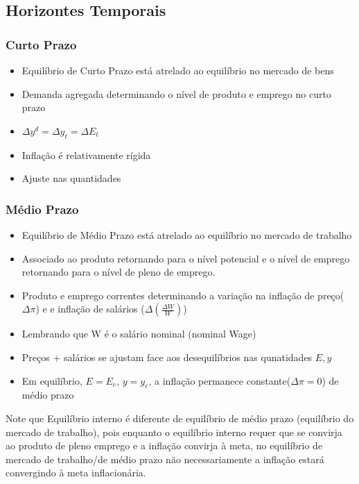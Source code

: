 \documentclass[a4paper,12pt]{article}[abntex2]
\begin{document}
\subsection{\textbf{Horizontes Temporais}}
\subsubsection{\textbf{Curto Prazo}}
\begin{itemize}
    \item Equilíbrio de Curto Prazo está atrelado ao equilíbrio no mercado de bens
    \item Demanda agregada determinando o nível de produto e emprego no curto prazo
    \item $\Delta y^d =\Delta y_t =\Delta E_t$
    \item Inflação é relativamente rígida
    \item Ajuste nas quantidades
\end{itemize}

\subsubsection{\textbf{Médio Prazo}}
\begin{itemize}
    \item Equilíbrio de Médio Prazo está atrelado ao equilíbrio no mercado de trabalho
    \item Associado  ao  produto  retornando  para  o  nível  potencial  e  o  nível  de  emprego retornando para o nível de pleno de emprego.
    \item Produto e emprego correntes determinando a variação na inflação de preço($\Delta\pi$) e e inflação de salários ($\Delta(\frac{\Delta W}{W})$)
    \item Lembrando que W é o salário nominal (nominal Wage)
    \item Preços + salários se ajustam face aos desequilíbrios nas qunatidades $E,y$
    \item Em equilíbrio, $E=E_e$, $y=y_e$, a inflação permanece constante($\Delta \pi=0$) de médio prazo
\end{itemize}

Note que Equilíbrio interno é diferente de equilíbrio de médio prazo (equilíbrio do mercado de trabalho), pois enquanto o equilíbrio interno requer que se convirja ao produto de pleno emprego e a inflação convirja à meta, no equilíbrio de mercado de trabalho/de médio prazo não necessariamente a inflação estará convergindo à meta inflacionária. 
\end{document}
